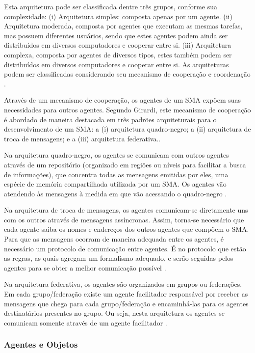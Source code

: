  Esta arquitetura pode ser classificada dentre três grupos, conforme sua complexidade: (i) Arquitetura simples: composta apenas por um agente. (ii) Arquitetura moderada, composta por agentes que executam as mesmas tarefas, mas possuem diferentes usuários, sendo que estes agentes podem ainda ser distribuídos em diversos computadores e cooperar entre si. (iii) Arquitetura complexa, composta por agentes de diversos tipos, estes também podem ser distribuídos em diversos computadores e cooperar entre si. As arquiteturas podem ser classificadas considerando seu mecanismo de cooperação e coordenação .

Através de um mecanismo de cooperação, os agentes de um SMA expõem suas necessidades para outros agentes. Segundo Girardi, este mecanismo de cooperação é abordado de maneira destacada em três padrões arquiteturais para o desenvolvimento de um SMA: a (i) arquitetura quadro-negro; a (ii) arquitetura de troca de mensagens; e a (iii) arquitetura federativa.\cite[p. 7]{girardi2004}. 

Na arquitetura quadro-negro, os agentes se comunicam com outros agentes através de um repositório (organizado em regiões ou níveis para facilitar a busca de informações), que concentra todas as mensagens emitidas por eles, uma espécie de memória compartilhada utilizada por um SMA. Os agentes vão atendendo às mensagens à medida em que vão acessando o quadro-negro \cite[p. 7]{girardi2004}.

Na arquitetura de troca de mensagens, os agentes comunicam-se diretamente uns com os outros através de mensagens assíncronas. Assim, torna-se necessário que cada agente saiba os nomes e endereços dos outros agentes que compõem o SMA. Para que as mensagens ocorram de maneira adequada entre os agentes, é necessário um protocolo de comunicação entre agentes. É no protocolo que estão as regras, as quais agregam um formalismo adequado, e serão seguidas pelos agentes para se obter a melhor comunicação possível \cite[p. 8]{girardi2004}.

Na arquitetura federativa, os agentes são organizados em grupos ou federações. Em cada grupo/federação existe um agente facilitador responsável por receber as mensagens que chega para cada grupo/federação e encaminhá-las para os agentes destinatários presentes no grupo. Ou seja, nesta arquitetura os agentes se comunicam somente através de um agente facilitador \cite[p. 8]{girardi2004}.


\subsubsection{Agentes e Objetos}

